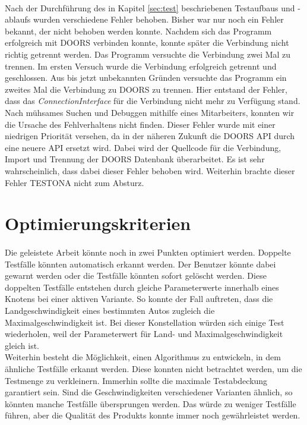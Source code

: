 \paragraph{}
Nach der Durchführung des in Kapitel \ref{sec:test} beschriebenen Testaufbaus und - ablaufs wurden verschiedene Fehler behoben. Bisher war nur noch ein Fehler bekannt, der nicht behoben werden konnte. Nachdem sich das Programm erfolgreich mit DOORS verbinden konnte, konnte später die Verbindung nicht richtig getrennt werden. Das Programm versuchte die Verbindung zwei Mal zu trennen. Im ersten Versuch wurde die Verbindung erfolgreich getrennt und geschlossen. Aus bis jetzt unbekannten Gründen versuchte das Programm ein zweites Mal die Verbindung zu DOORS zu trennen. Hier entstand der Fehler, dass das \textit{ConnectionInterface} für die Verbindung nicht mehr zu Verfügung stand.\\


Nach mühsames Suchen und Debuggen mithilfe eines Mitarbeiters, konnten wir die Ursache des Fehlverhaltens nicht finden. Dieser Fehler wurde mit einer niedrigen Priorität versehen, da in der näheren Zukunft die DOORS API durch eine neuere API ersetzt wird. Dabei wird der Quellcode für die Verbindung, Import und Trennung der DOORS Datenbank überarbeitet. Es ist sehr wahrscheinlich, dass dabei dieser Fehler behoben wird. Weiterhin brachte dieser Fehler TESTONA nicht zum Absturz.\\



\newpage
\section{Optimierungskriterien}
\paragraph{}
Die geleistete Arbeit könnte noch in zwei Punkten optimiert werden. Doppelte Testfälle könnten automatisch erkannt werden. Der Benutzer könnte dabei gewarnt werden oder die Testfälle könnten sofort gelöscht werden. Diese doppelten Testfälle entstehen durch gleiche Parameterwerte innerhalb eines Knotens bei einer aktiven Variante. So konnte der Fall auftreten, dass die Landgeschwindigkeit eines bestimmten Autos zugleich die Maximalgeschwindigkeit ist. Bei dieser Konstellation würden sich einige Test wiederholen, weil der Parameterwert für Land- und Maximalgeschwindigkeit gleich ist.\\


Weiterhin besteht die Möglichkeit, einen Algorithmus zu entwickeln, in dem ähnliche Testfälle erkannt werden. Diese konnten nicht betrachtet werden, um die Testmenge zu verkleinern. Immerhin sollte die maximale Testabdeckung garantiert sein. Sind die Geschwindigkeiten verschiedener Varianten ähnlich, so könnten manche Testfälle übersprungen werden. Das würde zu weniger Testfälle führen, aber die Qualität des Produkts konnte immer noch gewährleistet werden.